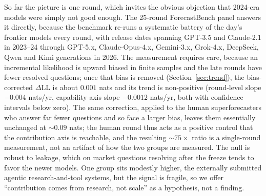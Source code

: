 \documentclass[11pt]{article}
\begin{document}
So far the picture is one round, which invites the obvious objection that 2024-era models were simply not good enough. The 25-round ForecastBench panel answers it directly, because the benchmark re-runs a systematic battery of the day's frontier models every round, with release dates spanning GPT-3.5 and Claude-2.1 in 2023--24 through GPT-5.x, Claude-Opus-4.x, Gemini-3.x, Grok-4.x, DeepSeek, Qwen and Kimi generations in 2026. The measurement requires care, because an incremental likelihood is upward biased in finite samples and the late rounds have fewer resolved questions; once that bias is removed (Section~\ref{sec:trend}), the bias-corrected $\Delta$LL is about $0.001$ nats and its trend is non-positive (round-level slope $-0.004$ nats/yr, capability-axis slope $-0.0012$ nats/yr, both with confidence intervals below zero). The same correction, applied to the human superforecasters who answer far fewer questions and so face a larger bias, leaves them essentially unchanged at $\sim\!0.09$ nats; the human round thus acts as a positive control that the contribution axis is reachable, and the resulting $\sim\!75\times$ ratio is a single-round measurement, not an artifact of how the two groups are measured. The null is robust to leakage, which on market questions resolving after the freeze tends to favor the newer models. One group sits modestly higher, the externally submitted agentic research-and-tool systems, but the signal is fragile, so we offer ``contribution comes from research, not scale'' as a hypothesis, not a finding.
\end{document}
